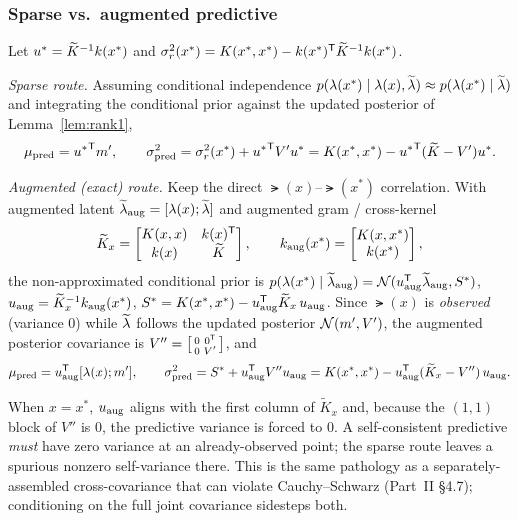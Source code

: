 \subsubsection{Sparse vs.\ augmented predictive}
Let $u^*=\widetilde{K}^{-1}k(x^*)$ and $\sigma_{r}^{2}(x^*)=K(x^*,x^*)-k(x^*)^{\mathsf{T}}\widetilde{K}^{-1}k(x^*)$.

\emph{Sparse route.} Assuming conditional independence $p(\lambda(x^*)\mid\lambda(x),\widetilde{\lambda})\approx p(\lambda(x^*)\mid\widetilde{\lambda})$ and integrating the conditional prior against the updated posterior of Lemma~\ref{lem:rank1},
\[
  \mu_{\mathrm{pred}}={u^*}^{\mathsf{T}}m',\qquad
  \sigma^{2}_{\mathrm{pred}}=\sigma_{r}^{2}(x^*)+{u^*}^{\mathsf{T}}V'u^*
                       =K(x^*,x^*)-{u^*}^{\mathsf{T}}(\widetilde{K}-V')u^*.
\]

\emph{Augmented (exact) route.} Keep the direct $\lat(x)$--$\lat(x^*)$
correlation. With augmented latent $\widetilde{\lambda}_{\mathrm{aug}}=[\lambda(x);\widetilde{\lambda}]$ and
augmented gram / cross-kernel
\[
  \widetilde{K}_{x}=\begin{bmatrix}K(x,x) & k(x)^{\mathsf{T}}\\ k(x) & \widetilde{K}\end{bmatrix},
  \qquad
  k_{\mathrm{aug}}(x^*)=\begin{bmatrix}K(x,x^*)\\ k(x^*)\end{bmatrix},
\]
the non-approximated conditional prior is
$p(\lambda(x^*)\mid\widetilde{\lambda}_{\mathrm{aug}})=\mathcal{N}(u_{\mathrm{aug}}^{\mathsf{T}}\widetilde{\lambda}_{\mathrm{aug}},S^*)$,
$u_{\mathrm{aug}}=\widetilde{K}_x^{-1}k_{\mathrm{aug}}(x^*)$,
$S^*=K(x^*,x^*)-u_{\mathrm{aug}}^{\mathsf{T}}\widetilde{K}_x\,u_{\mathrm{aug}}$.
Since $\lat(x)$ is \emph{observed} (variance $0$) while $\widetilde{\lambda}$ follows the
updated posterior $\mathcal{N}(m',V')$, the augmented posterior covariance is
$V''=\bigl[\begin{smallmatrix}0&0^{\mathsf{T}}\\0&V'\end{smallmatrix}\bigr]$, and
\[
  \mu_{\mathrm{pred}}=u_{\mathrm{aug}}^{\mathsf{T}}[\lambda(x);m'],\qquad
  \sigma^{2}_{\mathrm{pred}}=S^*+u_{\mathrm{aug}}^{\mathsf{T}} V''u_{\mathrm{aug}}
                       =K(x^*,x^*)-u_{\mathrm{aug}}^{\mathsf{T}}(\widetilde{K}_x-V'')\,u_{\mathrm{aug}}.
\]

\begin{remark}
When $x=x^*$, $u_{\mathrm{aug}}$ aligns with the first column of
$\widetilde{K}_x$ and, because the $(1,1)$ block of $V''$ is $0$, the predictive
variance is forced to $0$. A self-consistent predictive \emph{must} have zero
variance at an already-observed point; the sparse route leaves a spurious nonzero
self-variance there. This is the same pathology as a separately-assembled
cross-covariance that can violate Cauchy--Schwarz (Part~II \S4.7); conditioning
on the full joint covariance sidesteps both.
\end{remark}


